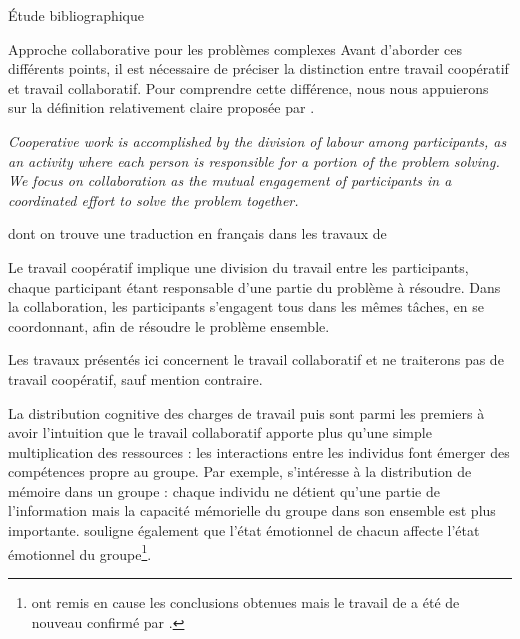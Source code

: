 \documentclass[myfrancais,ngerman,english,french]{mythesis}
\begin{document}
\begin{mychapter}{Étude bibliographique}
\begin{mysection}{Approche collaborative pour les problèmes complexes}
			Avant d'aborder ces différents points, il est nécessaire de préciser la distinction entre travail coopératif et travail collaboratif.
			Pour comprendre cette différence, nous nous appuierons sur la définition relativement claire proposée par .
			\begin{myquote}[english]
				\it Cooperative work is accomplished by the division of labour among participants, as an activity where each person is responsible for a portion of the problem solving.
				We focus on collaboration as the mutual engagement of participants in a coordinated effort to solve the problem together.
			\end{myquote}
			dont on trouve une traduction en français dans les travaux de 
			\begin{myquote}[french]
				Le travail coopératif implique une division du travail entre les participants, chaque participant étant responsable d’une partie du problème à résoudre.
				Dans la collaboration, les participants s’engagent tous dans les mêmes tâches, en se coordonnant, afin de résoudre le problème ensemble.
			\end{myquote}
			Les travaux présentés ici concernent le travail collaboratif et ne traiterons pas de travail coopératif, sauf mention contraire.
			\begin{mysubsection}{La distribution cognitive des charges de travail}
				 puis  sont parmi les premiers à avoir l'intuition que le travail collaboratif apporte plus qu'une simple multiplication des ressources : les interactions entre les individus font émerger des compétences propre au groupe.
				Par exemple,  s'intéresse à la distribution de mémoire dans un groupe : chaque individu ne détient qu'une partie de l'information mais la capacité mémorielle du groupe dans son ensemble est plus importante.
				 souligne également que l'état émotionnel de chacun affecte l'état émotionnel du groupe\footnote{ ont remis en cause les conclusions obtenues mais le travail de  a été de nouveau confirmé par .}.


\end{mysubsection}
\end{mysection}
\end{mychapter}
\end{document}
